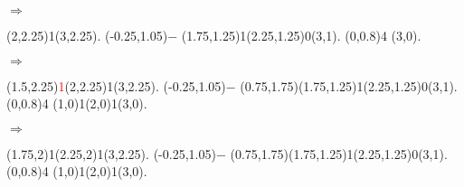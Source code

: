\documentclass[11pt,a4paper]{article}
\begin{document}
\begin{center}
\begin{table}[ht!]
\begin{minipage}{0.15\textwidth}
  \end{minipage}
  \hfillx
  \begin{minipage}{0.1\textwidth}

\phantom{ } $ \Rightarrow $

  \end{minipage}
  \hfillx
  \begin{minipage}{0.15\textwidth}

\par\vspace{3\oplineheight}
\oplput(2,2.25){1}\oplput(3,2.25){.}
\oplput(-0.25,1.05){$-$}
\oplput(1.75,1.25){\scriptsize 1}\oplput(2.25,1.25){\scriptsize 0}\oplput(3,1){.}
\ophline(0,0.8){4}
\oplput(3,0){.}

  \end{minipage}
  \hfillx
  \begin{minipage}{0.1\textwidth}

\phantom{ } $ \Rightarrow $

  \end{minipage}
  \hfillx
  \begin{minipage}{0.15\textwidth}

\par\vspace{3\oplineheight}
\oplput(1.5,2.25){\scriptsize \textcolor{red}{1}}\oplput(2,2.25){1}\oplput(3,2.25){.}
\oplput(-0.25,1.05){$-$}
\oplput(0.75,1.75){\tiny \textcolor{red}{}}\oplput(1.75,1.25){\scriptsize 1}\oplput(2.25,1.25){\scriptsize 0}\oplput(3,1){.}
\ophline(0,0.8){4}
\oplput(1,0){\textcolor{gray(x11gray)}{1}}\oplput(2,0){1}\oplput(3,0){.}

  \end{minipage}
  \hfillx
  \begin{minipage}{0.1\textwidth}

\phantom{ } $ \Rightarrow $

  \end{minipage}
  \hfillx
  \begin{minipage}{0.15\textwidth}

\par\vspace{3\oplineheight}
\oplput(1.75,2){\scriptsize 1}\oplput(2.25,2){\scriptsize 1}\oplput(3,2.25){.}
\oplput(-0.25,1.05){$-$}
\oplput(0.75,1.75){\tiny \textcolor{red}{}}\oplput(1.75,1.25){\scriptsize 1}\oplput(2.25,1.25){\scriptsize 0}\oplput(3,1){.}
\ophline(0,0.8){4}
\oplput(1,0){\textcolor{gray(x11gray)}{1}}\oplput(2,0){1}\oplput(3,0){.}


\end{minipage}
\end{table}
\end{center}
\end{document}
